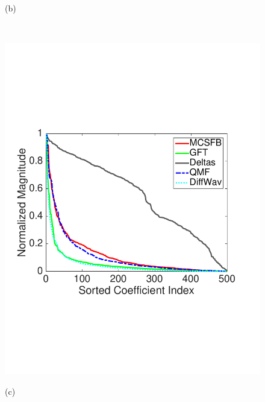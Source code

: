 \documentclass{article}
\begin{document}
\begin{figure}[tbh]
\begin{minipage}[m]{0.48\linewidth}
\centerline{\small{(b)}}
\end{minipage} \\
\vspace{.07in}
\begin{minipage}[m]{0.48\linewidth}
\centerline{\includegraphics[width=.96\linewidth]{fig_comp_coeff2}}
\centerline{\small{(c)}}
\end{minipage}
\begin{minipage}[m]{0.48\linewidth}

\end{minipage}
\end{figure}
\end{document}
